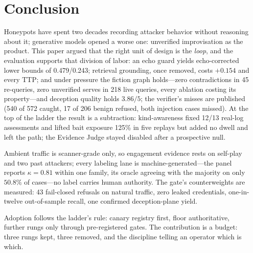 \section{Conclusion}
\label{sec:conclusion}

Honeypots have spent two decades recording attacker behavior without
reasoning about it; generative models opened a worse one: unverified
improvisation as the product. This paper argued that the right unit of
design is the \emph{loop}, and the evaluation supports that division of
labor: an echo guard yields echo-corrected lower bounds of 0.479/0.243;
retrieval grounding, once removed, costs $+0.154$ and every TTP; and
under pressure the fiction graph holds---zero
contradictions in 45 re-queries, zero unverified serves in 218 live
queries, every ablation costing its property---and deception quality
holds $3.86/5$; the verifier's misses are published (540 of 572 caught,
17 of 206 benign refused, both injection cases missed). At the top of
the ladder the result is a subtraction: kind-awareness fixed 12/13
real-log assessments and lifted bait exposure 125\% in five replays but
added no dwell and left the path; the Evidence Judge stayed disabled
after a prospective null.

Ambient traffic is scanner-grade only, so engagement evidence rests on
self-play and two past attackers; every labeling lane is
machine-generated---the panel reports $\kappa=0.81$ within one family,
its oracle agreeing with the majority on only $50.8\%$ of cases---no
label carries human authority. The gate's counterweights are measured:
43 fail-closed refusals on natural traffic, zero leaked credentials,
one-in-twelve out-of-sample recall, one confirmed deception-plane yield.

Adoption follows the ladder's rule: canary registry first, floor
authoritative, further rungs only through pre-registered gates. The
contribution is a budget: three rungs kept, three removed, and the
discipline telling an operator which is which.
